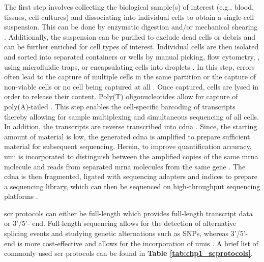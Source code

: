 The first step involves collecting the biological sample(s) of interest (e.g., blood, tissues, cell-cultures) and dissociating into individual cells to obtain a single-cell suspension. This can be done by enzymatic digestion and/or mechanical shearing \textbf{\cite{vieira_braga_tissue_2019}}. Additionally, the suspension can be purified to exclude dead cells or debris and can be further enriched for cell types of interest. Individual cells are then isolated and sorted into separated containers or wells by manual picking, \textbf{\cite{tang_mrna-seq_2009,kalisky_brief_2018,guo_resolution_2010}}
flow cytometry, \textbf{\cite{hayashi_single-cell_2010,jaitin_massively_2014}}, 
using microfluidic traps, \textbf{\cite{kalisky_brief_2018,treutlein_reconstructing_2014,streets_microfluidic_2014}} 
or encapsulating cells into droplets \textbf{\cite{kalisky_brief_2018,klein_droplet_2015,macosko_highly_2015}}. In this step, errors often lead to the capture of multiple cells in the same partition or the capture of non-viable cells or no cell being captured at all \textbf{\cite{svensson_exponential_2018}}. Once captured, cells are lysed in order to release their  content. Poly(T) oligonucleotides allow for capture of poly(A)-tailed . This step enables the cell-specific barcoding of transcripts thereby allowing for sample multiplexing and simultaneous sequencing of all cells. In addition, the transcripts are reverse transcribed into \gls{cdna} \textbf{\cite{svensson_exponential_2018,haque_practical_2017}}. Since, the starting amount of material is low, the generated \gls{cdna} is amplified to prepare sufficient material for subsequent sequencing. Herein, to improve quantification accuracy, \gls{umi} is incorporated to distinguish between the amplified copies of the same \gls{mrna} molecule and reads from separated \gls{mrna} molecules from the same gene \textbf{\cite{haque_practical_2017}}. The \gls{cdna} is then fragmented, ligated with sequencing adapters and indices to prepare a sequencing library, which can then be sequenced on high-throughput sequencing platforms \textbf{\cite{svensson_exponential_2018,haque_practical_2017}}.\\

\par \gls{scr} protocols can either be full-length which provides full-length transcript data or 3'/5'- end. Full-length sequencing allows for the detection of alternative splicing events and studying genetic alternations such as SNPs, whereas 3'/5'- end is more cost-effective and allows for the incorporation of \glspl{umi} \textbf{\cite{baran-gale_experimental_2018}}. A brief list of commonly used \gls{scr} protocols can be found in \textbf{Table \ref{tab:chp1_scprotocols}}.

